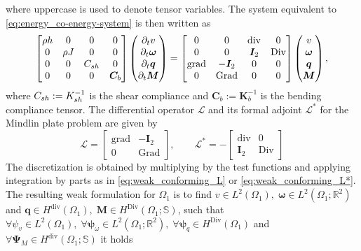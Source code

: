 \documentclass[11pt,a4paper]{article}
\newcommand{\bbR}{\mathbb{R}}
\newcommand{\bbS}{\mathbb{S}}
\DeclareMathOperator*{\grad}{grad}
\DeclareMathOperator*{\Grad}{Grad}
\renewcommand{\div}{\operatorname{div}}
\DeclareMathOperator*{\Div}{Div}
\begin{document}
where uppercase is used to denote tensor variables. The system equivalent to \eqref{eq:energy_co-energy-system} is then written as
\begin{equation}
    \begin{bmatrix}
        \rho h & 0 & 0 & 0 \\
        0 & \rho J & 0 & 0 \\
        0 & 0 &  C_{\rm sh} & 0 \\
        0 & 0 & 0 & \bm{C}_b
    \end{bmatrix}
    \begin{pmatrix}
        \partial_t v \\
        \partial_t\bm{\omega} \\
        \partial_t \bm{q} \\
        \partial_t \bm{M} \\
    \end{pmatrix} = 
    \begin{bmatrix}
        0 & 0 & \div & 0 \\
        0 & 0 & \bm{I}_2 & \Div \\
        \grad & -\bm{I}_2 & 0 & 0 \\
        0 & \Grad & 0 & 0 \\
    \end{bmatrix}
    \begin{pmatrix}
        v \\
        \bm{\omega} \\
        \bm{q} \\
        \bm{M} \\
    \end{pmatrix},
\end{equation}
where $C_{\rm sh}:=K^{-1}_{\rm sh}$ is the shear compliance and $\bm{C}_b := \bm{K}_b^{-1}$ is the bending compliance tensor. The differential operator $\mathcal{L}$  and its formal adjoint $\mathcal{L}^*$ for the Mindlin plate problem are given by
$$
\mathcal{L}= \begin{bmatrix}
     \grad & -\bm{I}_2  \\
     0 & \Grad
\end{bmatrix}, \qquad 
\mathcal{L}^*= - \begin{bmatrix}
     \div & 0 \\
    \bm{I}_2 & \Div 
\end{bmatrix}
$$ 
The discretization is obtained by multiplying by the test functions and applying integration by parts as in \eqref{eq:weak_conforming_L} or \eqref{eq:weak_conforming_L*}. The resulting weak formulation for $\Omega_1$ is to find $v \in L^2(\Omega_1), \; \bm{\omega}\in L^2(\Omega_1; \bbR^2)$  and $\bm{q}\in H^{\div}(\Omega_1), \; \bm{M}\in H^{\Div}(\Omega_1; \bbS)$, such that $\forall{\psi}_v\in L^2(\Omega_1), \; \forall\bm{\psi}_\omega\in L^2(\Omega_1; \bbR^2), \; \forall\bm{\psi}_q\in H^{\Div}(\Omega_1)$ and $\forall\bm{\Psi}_M\in H^{\div}(\Omega_1; \bbS)$ it holds
\end{document}
